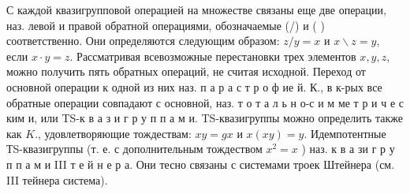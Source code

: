 \documentclass[10pt]{article}
\begin{document}
С каждой квазигрупповой операцией на множестве связаны еще две операции, наз. левой и правой обратной операциями, обозначаемые (/) и ( ) соответственно. Они определяются следующим образом: $z / y=x$ и $x \backslash z=y$, если $x \cdot y=z$. Рассматривая всевозможные перестановки трех элементов $x, y, z$, можно получить пять обратных операций, не считая исходной. Переход от основной операции к одной из них наз. п а р а с т р о ф ие й. К., в к-рых все обратные операции совпадают с основной, наз. т о т а л ь н о-с и м ме т р и ч е с ким и, или TS-к в а з и г р у п п а м и. TS-квазигруппы можно определить также как $K$., удовлетворяющие тождествам: $x y=g x$ и $x(x y)=y$. Идемпотентные ТS-квазигруппы (т. е. с дополнительным тождеством $x^{2}=x$ ) наз. к в а зи г р у п п а м и III т е й н е р а. Они тесно связаны с системами троек Штейнера (см. III тейнера система).
\end{document}
